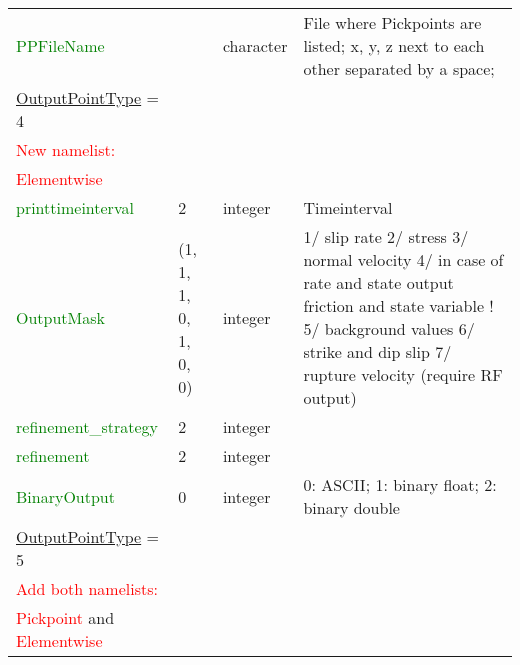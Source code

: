 \documentclass[12pt,twoside]{article}
\begin{document}
\begin{longtable}{|p{4.8cm}|p{2.4cm}|p{2cm}|p{5cm}|}
\textcolor{green}{PPFileName} & & character& File where Pickpoints are listed; x, y, z next to each other separated by a space;\\
\hdashline
\uline{OutputPointType} = 4 & & &\\
\textcolor{red}{New namelist:} & & &\\
\textcolor{red}{Elementwise} & & &\\
\textcolor{green}{printtimeinterval} & 2 & integer & Timeinterval \\
\textcolor{green}{OutputMask} & (1, 1, 1, 0, 1, 0, 0)& integer & 1/ slip rate 2/ stress 3/ normal velocity 4/ in case of rate and state output friction and state variable
                               ! 5/ background values 6/ strike and dip slip 7/ rupture velocity (require RF output)\\
\textcolor{green}{refinement\_strategy} & 2 & integer & \\
\textcolor{green}{refinement} & 2 & integer & \\
\textcolor{green}{BinaryOutput} & 0 & integer & 0: ASCII; 1: binary float; 2: binary double\\
\hdashline
\uline{OutputPointType} = 5 & & &\\
\textcolor{red}{Add both namelists:} & & &\\
\textcolor{red}{Pickpoint} and \textcolor{red}{Elementwise} & & &\\
\hline
\end{longtable}
\end{document}
